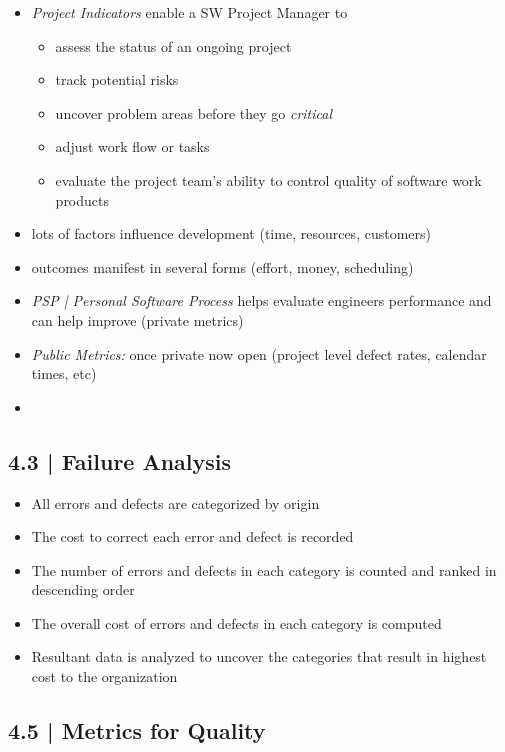 \documentclass{article}
\begin{document}
\begin{itemize}
\item \emph{Project Indicators} enable a SW Project Manager to
\begin{itemize}
\item assess the status of an ongoing project
\item track potential risks
\item uncover problem areas before they go \emph{critical}
\item adjust work flow or tasks
\item evaluate the project team's ability to control quality of software work products
\end{itemize}
\item lots of factors influence development (time, resources, customers)
\item outcomes manifest in several forms (effort, money, scheduling)
\item \emph{PSP | Personal Software Process} helps evaluate engineers performance and can help improve (private metrics)
\item \emph{Public Metrics: }once private now open (project level defect rates, calendar times, etc)
\item 
\end{itemize}


\subsection{4.3 | Failure Analysis}

\begin{itemize}
\item All errors and defects are categorized by origin
\item The cost to correct each error and defect is recorded
\item The number of errors and defects in each category is counted and ranked in descending order
\item The overall cost of errors and defects in each category is computed
\item Resultant data is analyzed to uncover the categories that result in highest cost to the organization
\end{itemize}

\subsection{4.5 | Metrics for Quality}
\end{document}
